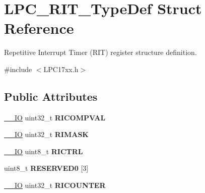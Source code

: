 \hypertarget{struct_l_p_c___r_i_t___type_def}{\section{\-L\-P\-C\-\_\-\-R\-I\-T\-\_\-\-Type\-Def \-Struct \-Reference}
\label{struct_l_p_c___r_i_t___type_def}
}


\-Repetitive \-Interrupt \-Timer (\-R\-I\-T) register structure definition.  




{\ttfamily \#include $<$\-L\-P\-C17xx.\-h$>$}

\subsection*{\-Public \-Attributes}
\begin{DoxyCompactItemize}
\item 
\hypertarget{struct_l_p_c___r_i_t___type_def_a61935034ac2503ec1803464a6007e931}{\hyperlink{group___c_m_s_i_s__core__definitions_gaec43007d9998a0a0e01faede4133d6be}{\-\_\-\-\_\-\-I\-O} uint32\-\_\-t {\bfseries \-R\-I\-C\-O\-M\-P\-V\-A\-L}}\label{struct_l_p_c___r_i_t___type_def_a61935034ac2503ec1803464a6007e931}

\item 
\hypertarget{struct_l_p_c___r_i_t___type_def_aae32ee454d1d50e89f7c2b115f81c006}{\hyperlink{group___c_m_s_i_s__core__definitions_gaec43007d9998a0a0e01faede4133d6be}{\-\_\-\-\_\-\-I\-O} uint32\-\_\-t {\bfseries \-R\-I\-M\-A\-S\-K}}\label{struct_l_p_c___r_i_t___type_def_aae32ee454d1d50e89f7c2b115f81c006}

\item 
\hypertarget{struct_l_p_c___r_i_t___type_def_a37145567c6963158ef90fb929b1b139c}{\hyperlink{group___c_m_s_i_s__core__definitions_gaec43007d9998a0a0e01faede4133d6be}{\-\_\-\-\_\-\-I\-O} uint8\-\_\-t {\bfseries \-R\-I\-C\-T\-R\-L}}\label{struct_l_p_c___r_i_t___type_def_a37145567c6963158ef90fb929b1b139c}

\item 
\hypertarget{struct_l_p_c___r_i_t___type_def_a98d0f22f7e719715ab2746fe626b636f}{uint8\-\_\-t {\bfseries \-R\-E\-S\-E\-R\-V\-E\-D0} \mbox{[}3\mbox{]}}\label{struct_l_p_c___r_i_t___type_def_a98d0f22f7e719715ab2746fe626b636f}

\item 
\hypertarget{struct_l_p_c___r_i_t___type_def_a56336b32d9afb119f8071e80c1dd754f}{\hyperlink{group___c_m_s_i_s__core__definitions_gaec43007d9998a0a0e01faede4133d6be}{\-\_\-\-\_\-\-I\-O} uint32\-\_\-t {\bfseries \-R\-I\-C\-O\-U\-N\-T\-E\-R}}\label{struct_l_p_c___r_i_t___type_def_a56336b32d9afb119f8071e80c1dd754f}

\end{DoxyCompactItemize}


